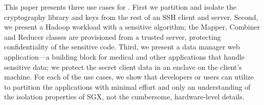 This paper presents three use cases for \systemname{}.
First we partition and isolate the 
cryptography library and keys from the rest of an SSH client and  server.
Second, we present a Hadoop workload with a sensitive algorithm;
the %
Mapper, Combiner and Reducer classes are provisioned from a trusted server, protecting confidentiality of the sensitive code.
Third, we present a data manager web application---a building block for medical and other applications that handle sensitive data; 
we protect the secret client data in an enclave on the client's machine.
For each of the use cases, we show that developers or users
can utilize \systemname{} to partition the applications
with minimal effort
and only an understanding of the isolation properties of SGX,
not the cumbersome, hardware-level details.  %


